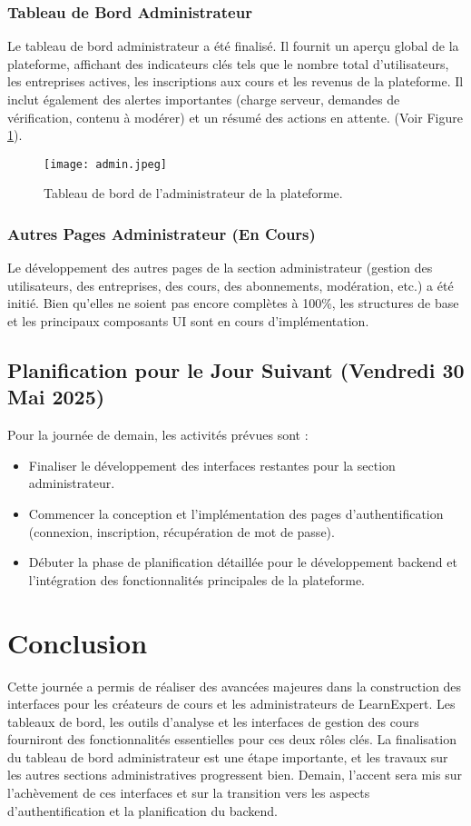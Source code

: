 \documentclass[12pt, a4paper]{article}
\begin{document}
\subsubsection{Tableau de Bord Administrateur}
Le tableau de bord administrateur a été finalisé. Il fournit un aperçu global de la plateforme, affichant des indicateurs clés tels que le nombre total d'utilisateurs, les entreprises actives, les inscriptions aux cours et les revenus de la plateforme. Il inclut également des alertes importantes (charge serveur, demandes de vérification, contenu à modérer) et un résumé des actions en attente. (Voir Figure \ref{fig:admin_dashboard}).

\begin{figure}[htbp]
  \centering
  \texttt{[image: admin.jpeg]} 
  \caption{Tableau de bord de l'administrateur de la plateforme.}
  \label{fig:admin_dashboard}
\end{figure}

\subsubsection{Autres Pages Administrateur (En Cours)}
Le développement des autres pages de la section administrateur (gestion des utilisateurs, des entreprises, des cours, des abonnements, modération, etc.) a été initié. Bien qu'elles ne soient pas encore complètes à 100\%, les structures de base et les principaux composants UI sont en cours d'implémentation.

\subsection{Planification pour le Jour Suivant (Vendredi 30 Mai 2025)}
Pour la journée de demain, les activités prévues sont :
\begin{itemize}
  \item Finaliser le développement des interfaces restantes pour la section administrateur.
  \item Commencer la conception et l'implémentation des pages d'authentification (connexion, inscription, récupération de mot de passe).
  \item Débuter la phase de planification détaillée pour le développement backend et l'intégration des fonctionnalités principales de la plateforme.
\end{itemize}

\section{Conclusion}
Cette journée a permis de réaliser des avancées majeures dans la construction des interfaces pour les créateurs de cours et les administrateurs de LearnExpert. Les tableaux de bord, les outils d'analyse et les interfaces de gestion des cours fourniront des fonctionnalités essentielles pour ces deux rôles clés. La finalisation du tableau de bord administrateur est une étape importante, et les travaux sur les autres sections administratives progressent bien. Demain, l'accent sera mis sur l'achèvement de ces interfaces et sur la transition vers les aspects d'authentification et la planification du backend.
\end{document}
